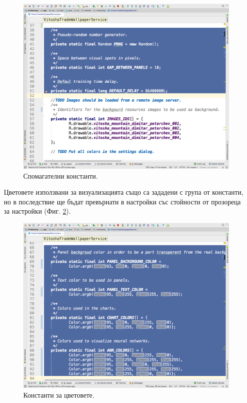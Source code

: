 \documentclass[book,14pt,oneside,openany]{memoir}
\begin{document}
\begin{figure}[h]
  \centering
  \includegraphics[height=0.45\pdfpageheight]{pic0031}
  \caption{Спомагателни константи.}
\label{fig:pic0031}
\end{figure}
\FloatBarrier

Цветовете използвани за визуализацията също са зададени с група от константи, но в последствие ще бъдат превърнати в настройки със стойности от прозореца за настройки (Фиг. \ref{fig:pic0032}).

\begin{figure}[h]
  \centering
  \includegraphics[height=0.45\pdfpageheight]{pic0032}
  \caption{Константи за цветовете.}
\label{fig:pic0032}
\end{figure}
\FloatBarrier
\end{document}
